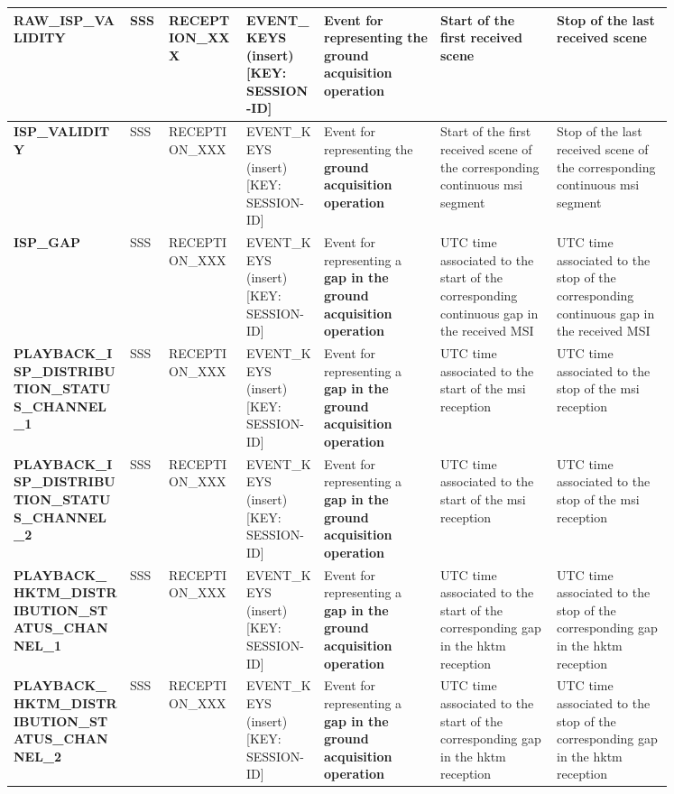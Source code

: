 \begin{landscape}
\begin{longtable}{|M{0.15\linewidth}|M{0.05\linewidth}|M{0.10\linewidth}|M{0.10\linewidth}|M{0.15\linewidth}|M{0.15\linewidth}|M{0.15\linewidth}|}
\textbf{RAW\_ISP\_VALIDITY} & SSS & \- RECEPTION\_XXX & EVENT\_KEYS (insert) [KEY: SESSION-ID] & Event for representing the \textbf{ground acquisition operation} & Start of the first received scene & Stop of the last received scene \\ \hline
\textbf{ISP\_VALIDITY} & SSS & \- RECEPTION\_XXX & EVENT\_KEYS (insert) [KEY: SESSION-ID] & Event for representing the \textbf{ground acquisition operation} & Start of the first received scene of the corresponding continuous \acrshort{msi} segment & Stop of the last received scene of the corresponding continuous \acrshort{msi} segment \\ \hline
\textbf{ISP\_GAP} & SSS & \- RECEPTION\_XXX & EVENT\_KEYS (insert) [KEY: SESSION-ID] & Event for representing a \textbf{gap in the ground acquisition operation} & UTC time associated to the start of the corresponding continuous gap in the received MSI & UTC time associated to the stop of the corresponding continuous gap in the received MSI \\ \hline
\textbf{PLAYBACK\_ISP\_DISTRIBUTION\_STATUS\_CHANNEL\_1} & SSS & \- RECEPTION\_XXX & EVENT\_KEYS (insert) [KEY: SESSION-ID] & Event for representing a \textbf{gap in the ground acquisition operation} & UTC time associated to the start of the \acrshort{msi} reception & UTC time associated to the stop of the \acrshort{msi} reception \\ \hline
\textbf{PLAYBACK\_ISP\_DISTRIBUTION\_STATUS\_CHANNEL\_2} & SSS & \- RECEPTION\_XXX & EVENT\_KEYS (insert) [KEY: SESSION-ID] & Event for representing a \textbf{gap in the ground acquisition operation} & UTC time associated to the start of the \acrshort{msi} reception & UTC time associated to the stop of the \acrshort{msi} reception \\ \hline
\textbf{PLAYBACK\_HKTM\_DISTRIBUTION\_STATUS\_CHANNEL\_1} & SSS & \- RECEPTION\_XXX & EVENT\_KEYS (insert) [KEY: SESSION-ID] & Event for representing a \textbf{gap in the ground acquisition operation} & UTC time associated to the start of the corresponding gap in the \acrshort{hktm} reception & UTC time associated to the stop of the corresponding gap in the \acrshort{hktm} reception \\ \hline
\textbf{PLAYBACK\_HKTM\_DISTRIBUTION\_STATUS\_CHANNEL\_2} & SSS & \- RECEPTION\_XXX & EVENT\_KEYS (insert) [KEY: SESSION-ID] & Event for representing a \textbf{gap in the ground acquisition operation} & UTC time associated to the start of the corresponding gap in the \acrshort{hktm} reception & UTC time associated to the stop of the corresponding gap in the \acrshort{hktm} reception \\ \hline

\end{longtable}
\end{landscape}
